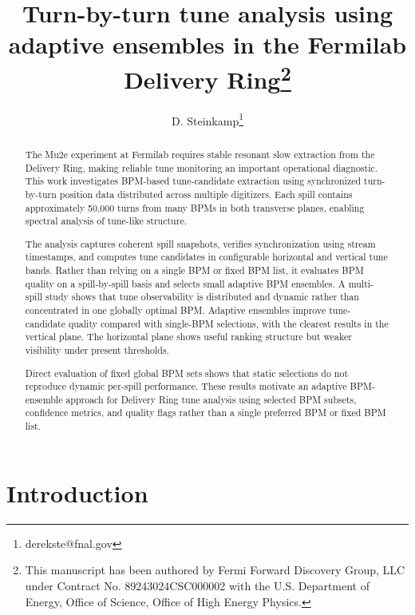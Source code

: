 \documentclass[]{jacow}
\begin{document}
\title{Turn-by-turn tune analysis using adaptive  ensembles in the Fermilab  Delivery Ring\thanks{This manuscript has been authored by Fermi Forward Discovery Group, LLC under Contract No. 89243024CSC000002 with the U.S. Department of Energy, Office of Science, Office of High Energy Physics.}}

\author{D. Steinkamp\thanks{derekste@fnal.gov}}

\maketitle

\begin{abstract}
The Mu2e experiment at Fermilab requires stable resonant slow extraction from the Delivery Ring, making reliable tune monitoring an important operational diagnostic. This work investigates BPM-based tune-candidate extraction using synchronized turn-by-turn position data distributed across multiple digitizers. Each spill contains approximately 50,000 turns from many BPMs in both transverse planes, enabling spectral analysis of tune-like structure.

The analysis captures coherent spill snapshots, verifies synchronization using stream timestamps, and computes tune candidates in configurable horizontal and vertical tune bands. Rather than relying on a single BPM or fixed BPM list, it evaluates BPM quality on a spill-by-spill basis and selects small adaptive BPM ensembles. A multi-spill study shows that tune observability is distributed and dynamic rather than concentrated in one globally optimal BPM. Adaptive ensembles improve tune-candidate quality compared with single-BPM selections, with the clearest results in the vertical plane. The horizontal plane shows useful ranking structure but weaker visibility under present thresholds.

Direct evaluation of fixed global BPM sets shows that static selections do not reproduce dynamic per-spill performance. These results motivate an adaptive BPM-ensemble approach for Delivery Ring tune analysis using selected BPM subsets, confidence metrics, and quality flags rather than a single preferred BPM or fixed BPM list.
\end{abstract}

\section{Introduction}
\end{document}
